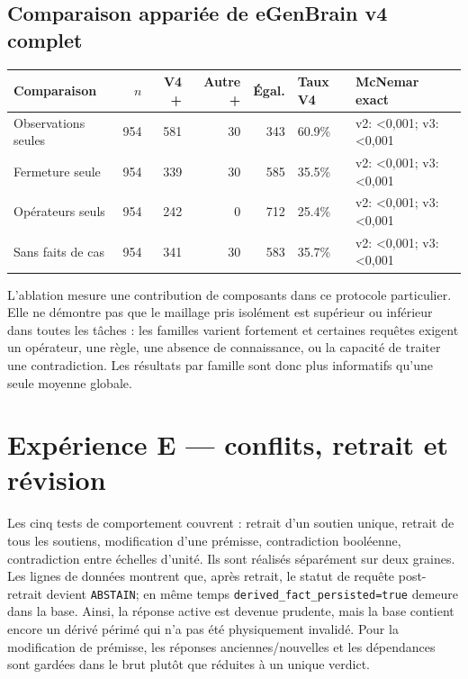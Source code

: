 \documentclass[11pt,a4paper]{article}
\begin{document}
\subsection{Comparaison appariée de eGenBrain v4 complet}
\scriptsize\setlength{\tabcolsep}{1.5pt}
\begin{longtable}{p{}rrrrp{}p{}}
\toprule Comparaison & $n$ & V4 + & Autre + & Égal. & Taux V4 & McNemar exact \\
\midrule

Observations seules & 954 & 581 & 30 & 343 & 60.9\% & v2: <0,001; v3: <0,001 \\
Fermeture seule & 954 & 339 & 30 & 585 & 35.5\% & v2: <0,001; v3: <0,001 \\
Opérateurs seuls & 954 & 242 & 0 & 712 & 25.4\% & v2: <0,001; v3: <0,001 \\
Sans faits de cas & 954 & 341 & 30 & 583 & 35.7\% & v2: <0,001; v3: <0,001 \\
\bottomrule
\end{longtable}
\normalsize\setlength{\tabcolsep}{6pt}

L’ablation mesure une contribution de composants dans ce protocole particulier. Elle ne démontre pas que le maillage pris isolément est supérieur ou inférieur dans toutes les tâches : les familles varient fortement et certaines requêtes exigent un opérateur, une règle, une absence de connaissance, ou la capacité de traiter une contradiction. Les résultats par famille sont donc plus informatifs qu’une seule moyenne globale.

\section{Expérience E — conflits, retrait et révision}

Les cinq tests de comportement couvrent : retrait d’un soutien unique, retrait de tous les soutiens, modification d’une prémisse, contradiction booléenne, contradiction entre échelles d’unité. Ils sont réalisés séparément sur deux graines. Les lignes de données montrent que, après retrait, le statut de requête post-retrait devient \texttt{ABSTAIN}; en même temps \texttt{derived\_fact\_persisted=true} demeure dans la base. Ainsi, la réponse active est devenue prudente, mais la base contient encore un dérivé périmé qui n’a pas été physiquement invalidé. Pour la modification de prémisse, les réponses anciennes/nouvelles et les dépendances sont gardées dans le brut plutôt que réduites à un unique verdict.
\end{document}
